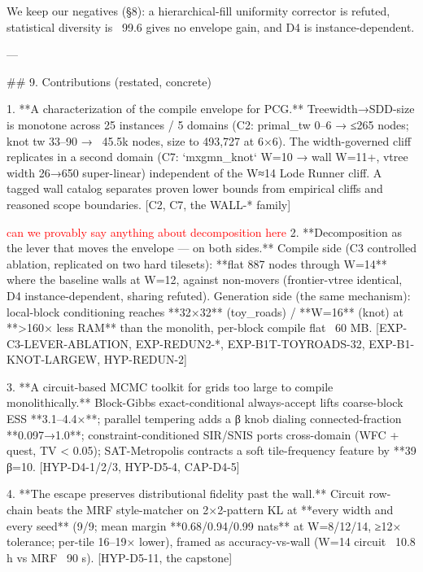\documentclass[letterpaper]{article} %
\newcommand{\todo}[1]{\textcolor{red}{#1}}
\begin{document}
We keep our negatives (§8): a hierarchical-fill uniformity corrector is refuted, statistical
diversity is ~99.6%
gives no envelope gain, and D4 is instance-dependent.

---

## 9. Contributions (restated, concrete)

1. **A characterization of the compile envelope for PCG.** Treewidth→SDD-size is monotone across 25
   instances / 5 domains (C2: primal_tw 0–6 → ≤265 nodes; knot tw 33–90 → ~45.5k nodes, size to
   493,727 at 6×6). The width-governed cliff replicates in a second domain (C7: `mxgmn_knot` W=10 →
   wall W=11+, vtree width 26→650 super-linear) independent of the W≈14 Lode Runner cliff. A tagged
   wall catalog separates proven lower bounds from empirical cliffs and reasoned scope boundaries.
   [C2, C7, the WALL-* family]

   \todo{can we provably say anything about decomposition here}
2. **Decomposition as the  lever that moves the envelope — on both sides.** Compile side (C3
   controlled ablation, replicated on two hard tilesets): **flat 887 nodes through W=14** where the
   baseline walls at W=12, against non-movers (frontier-vtree identical, D4 instance-dependent,
   sharing refuted). Generation side (the same mechanism): local-block conditioning reaches **32×32**
   (toy_roads) / **W=16** (knot) at **>160× less RAM** than the monolith, per-block compile flat
   ~60 MB. [EXP-C3-LEVER-ABLATION, EXP-REDUN2-*, EXP-B1T-TOYROADS-32, EXP-B1-KNOT-LARGEW, HYP-REDUN-2]

3. **A circuit-based MCMC toolkit for grids too large to compile monolithically.** Block-Gibbs
   exact-conditional always-accept lifts coarse-block ESS **3.1–4.4×**; parallel tempering adds a β
   knob dialing connected-fraction **0.097→1.0**; constraint-conditioned SIR/SNIS ports cross-domain
   (WFC + quest, TV < 0.05); SAT-Metropolis contracts a soft tile-frequency feature by **39%
   β=10. [HYP-D4-1/2/3, HYP-D5-4, CAP-D4-5]

4. **The escape preserves distributional fidelity past the wall.** Circuit row-chain beats the MRF
   style-matcher on 2×2-pattern KL at **every width and every seed** (9/9; mean margin
   **0.68/0.94/0.99 nats** at W=8/12/14, ≥12× tolerance; per-tile 16–19× lower), framed as
   accuracy-vs-wall (W=14 circuit ~10.8 h vs MRF ~90 s). [HYP-D5-11, the capstone]
\end{document}
